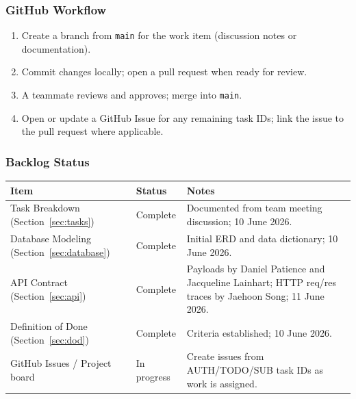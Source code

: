 \subsubsection{GitHub Workflow}
\begin{enumerate}
  \item Create a branch from \texttt{main} for the work item (discussion notes or documentation).
  \item Commit changes locally; open a pull request when ready for review.
  \item A teammate reviews and approves; merge into \texttt{main}.
  \item Open or update a GitHub Issue for any remaining task IDs; link the issue to the pull request where applicable.
\end{enumerate}

\subsubsection{Backlog Status}
\begin{tabularx}{\textwidth}{@{} l l X @{}}
  \toprule
  \textbf{Item} & \textbf{Status} & \textbf{Notes} \\
  \midrule
  Task Breakdown (Section~\ref{sec:tasks})       & Complete & Documented from team meeting discussion; 10 June 2026. \\
  Database Modeling (Section~\ref{sec:database}) & Complete & Initial ERD and data dictionary; 10 June 2026. \\
  API Contract (Section~\ref{sec:api})          & Complete & Payloads by Daniel Patience and Jacqueline Lainhart; HTTP req/res traces by Jaehoon Song; 11 June 2026. \\
  Definition of Done (Section~\ref{sec:dod})     & Complete & Criteria established; 10 June 2026. \\
  GitHub Issues / Project board                  & In progress & Create issues from AUTH/TODO/SUB task IDs as work is assigned. \\
  \bottomrule
\end{tabularx}

\newpage
